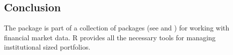 \documentclass[a4paper]{report}
\begin{document}
\begin{article}
\section{Conclusion}

The  package is part of a collection of packages (see
\cite{kane:backtest} and \cite{kane:portfolio}) for working with
financial market data. R provides all the necessary tools for
managing institutional sized portfolios.

\address{David Kane, Andrew Liu and Khanh Nguyen \\
  Kane Capital Management \\
  Cambridge, MA, USA\\
  , ,
  and 
}


\end{article}
\end{document}
